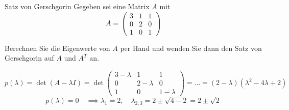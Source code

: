 \begin{example}{Satz von Gerschgorin}
    Gegeben sei eine Matrix $A$ mit
    \[
        A =
        \begin{pmatrix}
            3 & 1 & 1 \\
            0 & 2 & 0 \\
            1 & 0 & 1
        \end{pmatrix}
    \]

    Berechnen Sie die Eigenwerte von $A$ per Hand und wenden Sie dann den Satz von Gerschgorin auf $A$ und $A^T$ an.

    \exampleseparator

    \[
        p(\lambda) = \det(A - \lambda I) = \det
        \begin{pmatrix}
            3 - \lambda & 1           & 1           \\
            0           & 2 - \lambda & 0           \\
            1           & 0           & 1 - \lambda
        \end{pmatrix}
        = \ldots = (2 - \lambda) (\lambda^2 - 4\lambda + 2)
    \]
    \[
        p(\lambda) = 0 \quad \implies \lambda_1 = 2, \quad \lambda_{2, 3} = 2 \pm \sqrt{4 - 2} = 2 \pm \sqrt{2}
    \]


\end{example}
